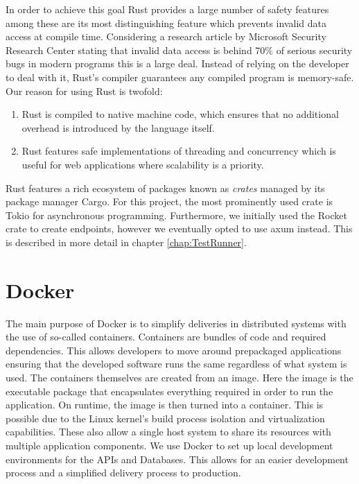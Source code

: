 In order to achieve this goal Rust provides a large number of safety features among these are its most distinguishing feature which prevents invalid data access at compile time. 
Considering a research article by Microsoft Security Research Center stating that invalid data access is behind 70\% of serious security bugs in modern programs this is a large deal\cite{Safe_Systems_Languages}. 
Instead of relying on the developer to deal with it, Rust's compiler guarantees any compiled program is memory-safe\cite{Rust_in_Action}.
Our reason for using Rust is twofold:
\begin{enumerate}
    \item Rust is compiled to native machine code, which ensures that no additional overhead is introduced by the language itself. 
    \item Rust features safe implementations of threading and concurrency which is useful for web applications where scalability is a priority.
\end{enumerate}
Rust features a rich ecosystem of packages known as \textit{crates} managed by its package manager Cargo\cite{Cargo}.
For this project, the most prominently used crate is Tokio\cite{Tokio} for asynchronous programming.
Furthermore, we initially used the Rocket\cite{Rocket} crate to create endpoints, however we eventually opted to use axum\cite{axum} instead.
This is described in more detail in chapter \ref{chap:TestRunner}.

\section*{Docker}
The main purpose of Docker is to simplify deliveries in distributed systems with the use of so-called containers\cite{Docker_Container}.
Containers are bundles of code and required dependencies. This allows developers to move around prepackaged applications ensuring that the developed software runs the same regardless of what system is used\cite{Docker_Container}.
The containers themselves are created from an image. Here  the image is the executable package that encapsulates everything required in order to run the application. On runtime, the image is then turned into a container.
This is possible due to the Linux kernel's build process isolation and virtualization capabilities. These also allow a single host system to share its resources with multiple application components\cite{Docker_Container}.
We use Docker to set up local development environments for the APIs and Databases. This allows for an easier development process and a simplified delivery process to production.


